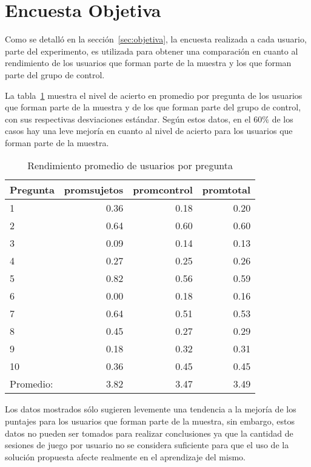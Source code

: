 \section{Encuesta Objetiva}
\label{sec:res_OBJETIVA}

Como se detalló en la sección~\ref{sec:objetiva}, la encuesta realizada a cada
usuario, parte del experimento, es utilizada para obtener una comparación en
cuanto al rendimiento de los usuarios que forman parte de la muestra y los que
forman parte del grupo de control.

La tabla~\ref{tab:objetiva_rendimiento_por_pregunta} muestra el nivel de acierto
en promedio por pregunta de los usuarios que forman parte de la muestra y de los que
forman parte del grupo de control, con sus respectivas desviaciones estándar. Según
estos datos, en el $60\%$ de los casos hay una leve mejoría en cuanto al nivel de acierto
para los usuarios que forman parte de la muestra.

\begin{table}[!hbt]
\centering
\begin{tabular}{lrrr}
\toprule
\textbf{Pregunta} & 
\textbf{promsujetos} & 
\textbf{promcontrol} & 
\textbf{promtotal} \\ 
\midrule
1         & 0.36 & 0.18 & 0.20 \\
2         & 0.64 & 0.60 & 0.60 \\
3         & 0.09 & 0.14 & 0.13 \\
4         & 0.27 & 0.25 & 0.26 \\
5         & 0.82 & 0.56 & 0.59 \\
6         & 0.00 & 0.18 & 0.16 \\
7         & 0.64 & 0.51 & 0.53 \\
8         & 0.45 & 0.27 & 0.29 \\
9         & 0.18 & 0.32 & 0.31 \\
10        & 0.36 & 0.45 & 0.45 \\
\midrule
Promedio: & 3.82 & 3.47 & 3.49  \\
\bottomrule
\end{tabular}
\caption{Rendimiento promedio de usuarios por pregunta}
\label{tab:objetiva_rendimiento_por_pregunta}
\end{table}

Los datos mostrados sólo sugieren levemente una tendencia a la mejoría de los puntajes 
para los usuarios que forman parte de la muestra, sin embargo, estos datos no pueden ser 
tomados para realizar conclusiones ya que la cantidad de sesiones de juego por usuario no 
se considera suficiente para que el uso de la solución propuesta afecte realmente en el 
aprendizaje del mismo.

